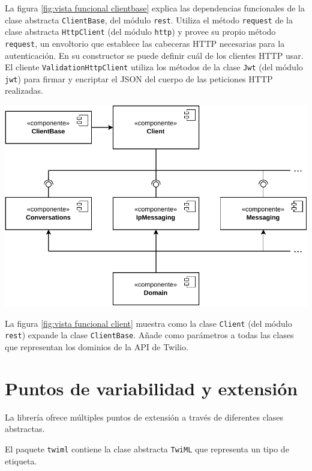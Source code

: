 \documentclass{article}
\begin{document}
\hfill

La figura \ref{fig:vista funcional clientbase}
explica las dependencias funcionales de
la clase abstracta \verb|ClientBase|,
del módulo \verb|rest|.
Utiliza el método \verb|request|
de la clase abstracta \verb|HttpClient|
(del módulo \verb|http|)
y provee su propio método \verb|request|,
un envoltorio que establece las cabeceras HTTP necesarias para la autenticación.
En su constructor se puede definir cuál de los clientes HTTP usar.
El cliente \verb|ValidationHttpClient|
utiliza los métodos de la clase \verb|Jwt|
(del módulo \verb|jwt|)
para firmar y encriptar el JSON del cuerpo
de las peticiones HTTP realizadas.

\hfill

\begin{center}
  \includegraphics[width=\textwidth]{VistaFuncionalCliente.pdf}
  \label{fig:vista funcional client}
\end{center}

\hfill

La figura \ref{fig:vista funcional client}
muestra como la clase \verb|Client|
(del módulo \verb|rest|)
expande la clase \verb|ClientBase|.
Añade como parámetros a todas las clases
que representan los dominios de la API de Twilio.


\section{Puntos de variabilidad y extensión}

La librería ofrece múltiples puntos de extensión
a través de diferentes clases abstractas.

El paquete \verb|twiml| contiene la clase abstracta \verb|TwiML|
que representa un tipo de etiqueta.
\end{document}

